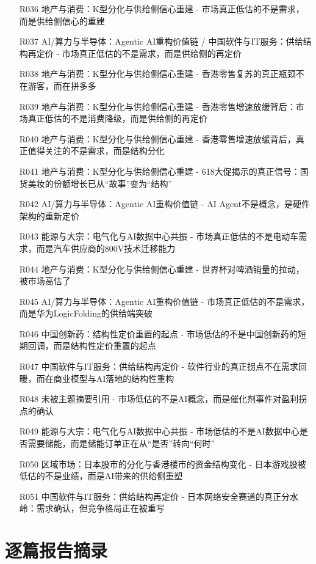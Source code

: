 \documentclass[11pt]{ctexart}
\begin{document}
\begin{itemize}
  \item [R036] 地产与消费：K型分化与供给侧信心重建 - 市场真正低估的不是需求，而是供给侧信心的重建
  \item [R037] AI/算力与半导体：Agentic AI重构价值链 / 中国软件与IT服务：供给结构再定价 - 市场真正低估的不是需求，而是供给侧的再定价
  \item [R038] 地产与消费：K型分化与供给侧信心重建 - 香港零售复苏的真正瓶颈不在游客，而在拼多多
  \item [R039] 地产与消费：K型分化与供给侧信心重建 - 香港零售增速放缓背后：市场真正低估的不是消费降级，而是供给侧的再定价
  \item [R040] 地产与消费：K型分化与供给侧信心重建 - 香港零售增速放缓背后，真正值得关注的不是需求，而是结构分化
  \item [R041] 地产与消费：K型分化与供给侧信心重建 - 618大促揭示的真正信号：国货美妆的份额增长已从“故事”变为“结构”
  \item [R042] AI/算力与半导体：Agentic AI重构价值链 - AI Agent不是概念，是硬件架构的重新定价
  \item [R043] 能源与大宗：电气化与AI数据中心共振 - 市场真正低估的不是电动车需求，而是汽车供应商的800V技术迁移能力
  \item [R044] 地产与消费：K型分化与供给侧信心重建 - 世界杯对啤酒销量的拉动，被市场高估了
  \item [R045] AI/算力与半导体：Agentic AI重构价值链 - 市场真正低估的不是需求，而是华为LogicFolding的供给端突破
  \item [R046] 中国创新药：结构性定价重置的起点 - 市场低估的不是中国创新药的短期回调，而是结构性定价重置的起点
  \item [R047] 中国软件与IT服务：供给结构再定价 - 软件行业的真正拐点不在需求回暖，而在商业模型与AI落地的结构性重构
  \item [R048] 未被主题摘要引用 - 市场低估的不是AI概念，而是催化剂事件对盈利拐点的确认
  \item [R049] 能源与大宗：电气化与AI数据中心共振 - 市场低估的不是AI数据中心是否需要储能，而是储能订单正在从“是否”转向“何时”
  \item [R050] 区域市场：日本股市的分化与香港楼市的资金结构变化 - 日本游戏股被低估的不是业绩，而是AI带来的供给侧重塑
  \item [R051] 中国软件与IT服务：供给结构再定价 - 日本网络安全赛道的真正分水岭：需求确认，但竞争格局正在被重写
\end{itemize}
\section{逐篇报告摘录}
\end{document}
